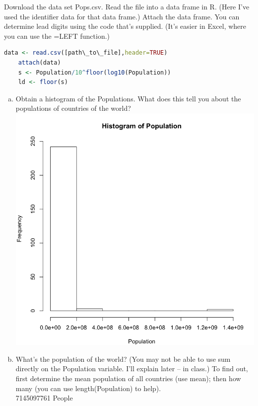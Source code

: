 \documentclass{scrartcl}
\begin{document}
\begin{enumerate}
Download the data set Pops.csv. Read the file into a data frame in R. (Here I’ve used the identifier data for that data frame.) Attach the data frame. You can determine lead digits  using the code that’s supplied. (It’s easier in Excel, where you can use the =LEFT function.)
  \begin{lstlisting}[language=R]
    data <- read.csv([path\_to\_file],header=TRUE)
    attach(data)
    s <- Population/10^floor(log10(Population))
    ld <- floor(s)
  \end{lstlisting}


  \begin{enumerate}[a)]
    \item Obtain a histogram of the Populations. What does this tell you about the populations of countries of the world?\\
      \includegraphics[keepaspectratio=true, scale=0.4]{5a.png}

    \item What’s the population of the world? (You may not be able to use sum directly on the Population variable. I’ll explain later – in class.) To find out, first determine the mean  population of all countries (use mean); then how many (you can use length(Population) to help).\\
      
      7145097761 People


\end{enumerate}
\end{enumerate}
\end{document}
